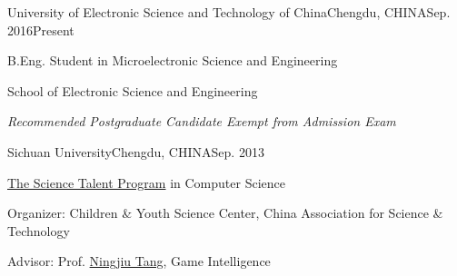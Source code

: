 
\begin{eduitem}{University of Electronic Science and Technology of China}{Chengdu, CHINA}{Sep. 2016}{Present}
\item B.Eng. Student in Microelectronic Science and Engineering
\item School of Electronic Science and Engineering
\item {\emph{Recommended Postgraduate Candidate Exempt from Admission Exam}}
\end{eduitem}

\begin{eduitem}{Sichuan University}{Chengdu, CHINA}{Sep. 2013}%
\item \href{http://ycjh.org}{The Science Talent Program} in Computer Science 
\item Organizer: Children \& Youth Science Center, China Association for Science \& Technology
\item Advisor: Prof. \href{http://cs.scu.edu.cn/info/1074/3930.htm}{Ningjiu Tang}, Game Intelligence
\end{eduitem}


\endinput